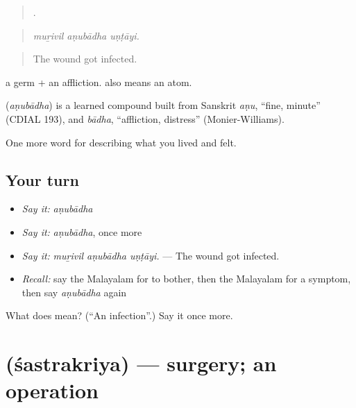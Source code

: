 \begin{quote}
  .
\end{quote}

\begin{quote}
\emph{muṟivil aṇubādha uṇṭāyi.}
\end{quote}

\begin{quote}
The wound got infected.
\end{quote}

 a germ +  an affliction.  also means an atom.

\begin{cousinweb}
\textbf{} (\emph{aṇubādha}) is a learned compound built from Sanskrit \emph{aṇu}, \textquotedblleft{}fine, minute\textquotedblright{} (CDIAL 193), and \emph{bādha}, \textquotedblleft{}affliction, distress\textquotedblright{} (Monier-Williams).
\end{cousinweb}

\begin{grammarlens}[title={What you've built}]
One more word for describing what you lived and felt.
\end{grammarlens}

\subsection*{Your turn}
\begin{itemize}
\raggedright
  \item \emph{Say it:} \emph{aṇubādha}
  \item \emph{Say it:} \emph{aṇubādha}, once more
  \item \emph{Say it:} \emph{muṟivil aṇubādha uṇṭāyi.} — The wound got infected.
  \item \emph{Recall:} say the Malayalam for to bother, then the Malayalam for a symptom, then say \emph{aṇubādha} again
\end{itemize}

\begin{tcolorbox}[breakable,colback=teal!4,colframe=teal!35!black,title={Before you move on}]
What does  mean? (\textquotedblleft{}An infection\textquotedblright{}.) Say it once more.
\end{tcolorbox}
\section[\texorpdfstring{\ml{ശസ്ത്രക്രിയ} (śastrakriya)}{ശസ്ത്രക്രിയ (śastrakriya)}]{ (śastrakriya) — surgery; an operation}

